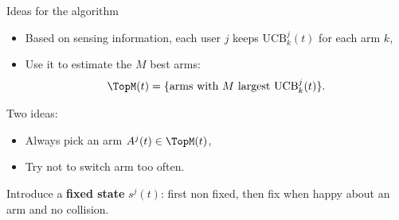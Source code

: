 \documentclass[12pt,english,ignorenonframetext,]{beamer}
\providecommand{\tightlist}{%
  \setlength{\itemsep}{0pt}\setlength{\parskip}{0pt}}
\begin{document}
\begin{frame}{Ideas for the \MCTopM{} algorithm}

\begin{itemize}\tightlist
\item
  Based on sensing information, each user \(j\) keeps \(\mathrm{UCB}_k^j(t)\) for each arm \(k\),
\item
  Use it to estimate the \(M\) best arms:
  \[\TopM(t) = \{\text{arms with } M \text{ largest } \mathrm{UCB}_k^j(t)\}.\]
\end{itemize}

Two ideas:
\begin{itemize}\tightlist
  \item
  Always pick an arm \(A^j(t) \in \TopM(t)\),
  \item
  Try not to switch arm too often.
\end{itemize}

Introduce a \textbf{fixed state} \(s^j(t)\):
\newline
first non fixed, then fix when happy about an arm and no collision.

\end{frame}
\end{document}
